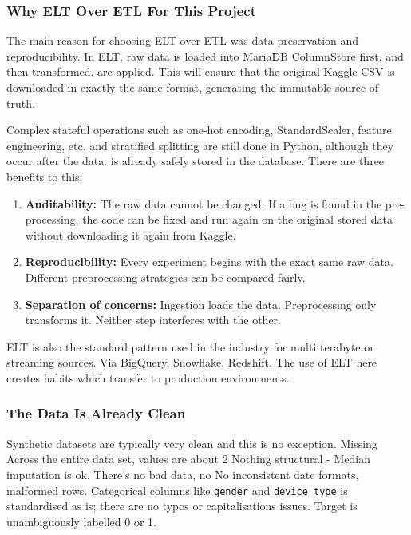 \documentclass[12pt,a4paper]{article}
\begin{document}
\subsubsection*{Why ELT Over ETL For This Project}

The main reason for choosing ELT over ETL was data preservation and reproducibility.
In ELT, raw data is loaded into MariaDB ColumnStore first, and then transformed. 
are applied. This will ensure that the original Kaggle CSV is downloaded in exactly the same format, 
generating the immutable source of truth.

Complex stateful operations such as one-hot encoding, StandardScaler, feature engineering, etc. 
and stratified splitting are still done in Python, although they occur after the data. 
is already safely stored in the database. There are three benefits to this:

\begin{enumerate}[leftmargin=*, itemsep=2pt]
  \item \textbf{Auditability:} The raw data cannot be changed. If a bug is found in the pre-processing, the code can be fixed and run again on the original stored data without downloading it again from Kaggle.
  
  \item \textbf{Reproducibility:} Every experiment begins with the exact same raw data. Different preprocessing strategies can be compared fairly.
  
  \item \textbf{Separation of concerns:} Ingestion loads the data. Preprocessing 
    only transforms it. Neither step interferes with the other.
\end{enumerate}

ELT is also the standard pattern used in the industry for multi terabyte or streaming sources.
Via BigQuery, Snowflake, Redshift. The use of ELT here creates habits which transfer to
production environments.

\subsubsection*{The Data Is Already Clean}

Synthetic datasets are typically very clean and this is no exception. Missing
Across the entire data set, values are about 2%
Nothing structural - Median imputation is ok. There's no bad data, no
No inconsistent date formats, malformed rows. Categorical columns like \texttt{gender}
and \texttt{device\_type} is standardised as is; there are no typos or capitalisations
issues. Target is unambiguously labelled 0 or 1.
\end{document}

